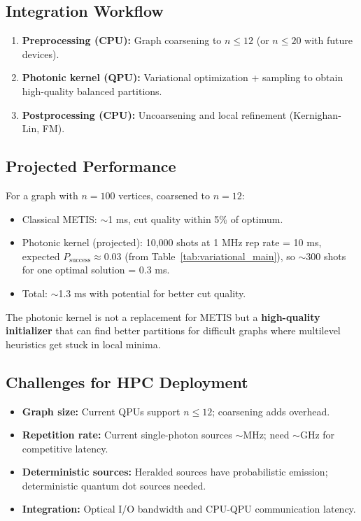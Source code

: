 \subsection{Integration Workflow}

\begin{enumerate}
\item \textbf{Preprocessing (CPU):} Graph coarsening to $n \le 12$ (or $n \le 20$ with future devices).
\item \textbf{Photonic kernel (QPU):} Variational optimization + sampling to obtain high-quality balanced partitions.
\item \textbf{Postprocessing (CPU):} Uncoarsening and local refinement (Kernighan-Lin, FM).
\end{enumerate}

\subsection{Projected Performance}

For a graph with $n=100$ vertices, coarsened to $n=12$:
\begin{itemize}
\item Classical METIS: $\sim$1 ms, cut quality within 5\% of optimum.
\item Photonic kernel (projected): 10,000 shots at 1 MHz rep rate = 10 ms, expected $P_{\mathrm{success}} \approx 0.03$ (from Table~\ref{tab:variational_main}), so $\sim$300 shots for one optimal solution = 0.3 ms.
\item Total: $\sim$1.3 ms with potential for better cut quality.
\end{itemize}

The photonic kernel is not a replacement for METIS but a \textbf{high-quality initializer} that can find better partitions for difficult graphs where multilevel heuristics get stuck in local minima.

\subsection{Challenges for HPC Deployment}

\begin{itemize}
\item \textbf{Graph size:} Current QPUs support $n \le 12$; coarsening adds overhead.
\item \textbf{Repetition rate:} Current single-photon sources $\sim$MHz; need $\sim$GHz for competitive latency.
\item \textbf{Deterministic sources:} Heralded sources have probabilistic emission; deterministic quantum dot sources needed.
\item \textbf{Integration:} Optical I/O bandwidth and CPU-QPU communication latency.
\end{itemize}

